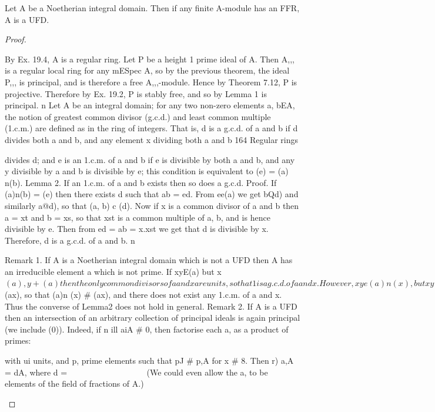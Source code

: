 \begin{theorem}[Theorem 20.4]\label{mcrt-auto-theorem-20-4}
\begin{mathematicalrecord}
Let A be a Noetherian integral domain. Then if any finite
  A-module has an FFR, A is a UFD.
\end{mathematicalrecord}
\end{theorem}
\begin{proof}
\begin{mathematicalrecord}
By Ex. 19.4, A is a regular ring. Let P be a height 1 prime ideal
  of A. Then A,,, is a regular local ring for any mESpec A, so by the previous
  theorem, the ideal P,,, is principal, and is therefore a free A,,,-module. Hence
  by Theorem 7.12, P is projective. Therefore by Ex. 19.2, P is stably free,
  and so by Lemma 1 is principal.         n
     Let A be an integral domain; for any two non-zero elements a, bEA,
  the notion of greatest common divisor (g.c.d.) and least common multiple
  (1.c.m.) are defined as in the ring of integers. That is, d is a g.c.d. of a and
  b if d divides both a and b, and any element x dividing both a and b
164      Regular rings

divides d; and e is an 1.c.m. of a and b if e is divisible by both a and b,
and any y divisible by a and b is divisible by e; this condition is equivalent
to (e) = (a) n(b).
Lemma 2. If an 1.c.m. of a and b exists then so does a g.c.d.
Proof. If (a)n(b) = (e) then there exists d such that ab = ed. From ee(a)
we get bQd) and similarly a@d), so that (a, b) c (d). Now if x is a common
divisor of a and b then a = xt and b = xs, so that xst is a common multiple
of a, b, and is hence divisible by e. Then from ed = ab = x.xst we get that
d is divisible by x. Therefore, d is a g.c.d. of a and b. n

Remark 1. If A is a Noetherian    integral domain which is not a UFD then
A has an irreducible element a which is not prime. If xyE(a) but x$(a),
 y+(a) then the only common divisors of a and x are units, so that 1 is a
g.c.d. of a and x. However, xye(a)n(x),          but xy$(ax), so that (a)n
(x) # (ax), and there does not exist any 1.c.m. of a and x. Thus the converse
of Lemma2 does not hold in general.
Remark 2. If A is a UFD then an intersection        of an arbitrary collection
of principal ideals is again principal (we include (0)). Indeed, if n ill aiA # 0,
then factorise each a, as a product of primes:



with ui units, and p, prime elements such that pJ # p,A for x # 8.
Then r) a,A = dA, where d = ~~~~~~~~~~~~~~~~~~
                                             (We could even allow the a, to
be elements of the field of fractions of A.)
\end{mathematicalrecord}
\end{proof}


